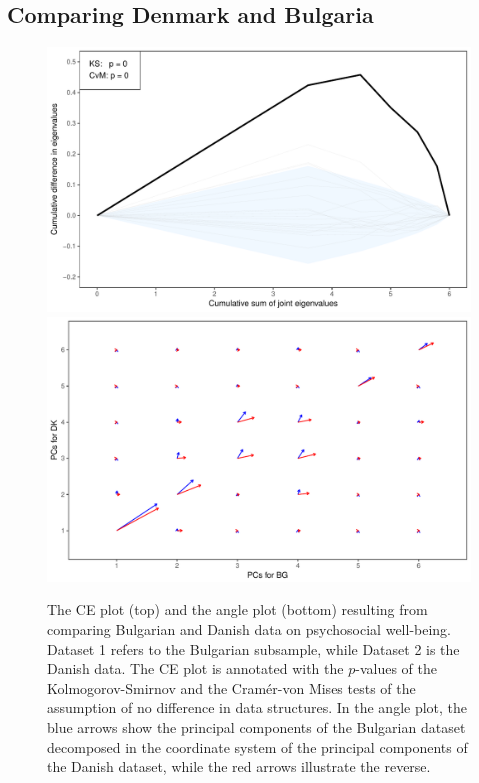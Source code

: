 \documentclass[titlepage,11pt,twoside]{article}
\begin{document}
\subsection{Comparing Denmark and Bulgaria}
\begin{figure}
\center
\includegraphics[scale = 0.7]{essDKBGce.pdf}
\includegraphics[scale = 0.7]{essDKBGhair.pdf}
\caption{The CE plot (top) and the angle plot (bottom) resulting from comparing Bulgarian and Danish data on psychosocial well-being. Dataset 1 refers to the Bulgarian subsample, while Dataset 2 is the Danish data. The CE plot is annotated with the $p$-values of the Kolmogorov-Smirnov and the Cram\'er-von Mises tests of the assumption of no difference in data structures. In the angle plot, the blue arrows show the principal components of the Bulgarian dataset decomposed in the coordinate system of the principal components of the Danish dataset, while the red arrows illustrate the reverse.}
\label{plotBG.cehair}
\end{figure}
\end{document}

